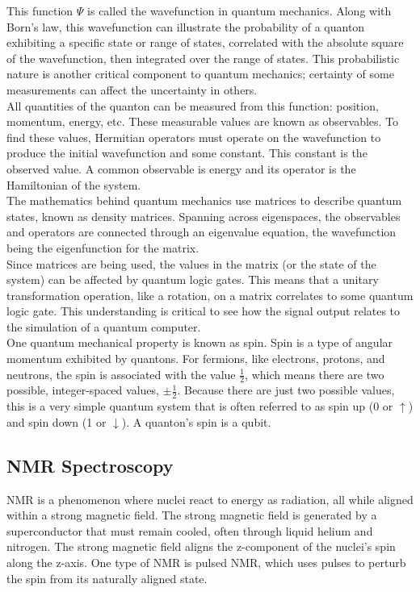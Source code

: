 \documentclass[11pt]{article}
\begin{document}
\begin{multicols}{2}
This function $\Psi$ is called the wavefunction in quantum mechanics. Along with Born's law, this wavefunction can illustrate the probability of a quanton exhibiting a specific state or range of states, correlated with the absolute square of the wavefunction, then integrated over the range of states. This probabilistic nature is another critical component to quantum mechanics; certainty of some measurements can affect the uncertainty in others. \\

All quantities of the quanton can be measured from this function: position, momentum, energy, etc. These measurable values are known as observables. To find these values, Hermitian operators must operate on the wavefunction to produce the initial wavefunction and some constant. This constant is the observed value. A common observable is energy and its operator is the Hamiltonian of the system. \\

The mathematics behind quantum mechanics use matrices to describe quantum states, known as density matrices. Spanning across eigenspaces, the observables and operators are connected through an eigenvalue equation, the wavefunction being the eigenfunction for the matrix. \\

Since matrices are being used, the values in the matrix (or the state of the system) can be affected by quantum logic gates. This means that a unitary transformation operation, like a rotation, on a matrix correlates to some quantum logic gate. This understanding is critical to see how the signal output relates to the simulation of a quantum computer. \\

One quantum mechanical property is known as spin. Spin is a type of angular momentum exhibited by quantons. For fermions, like electrons, protons, and neutrons, the spin is associated with the value $\frac{1}{2}$, which means there are two possible, integer-spaced values, $\pm\frac{1}{2}$. Because there are just two possible values, this is a very simple quantum system that is often referred to as spin up (0 or $\uparrow$) and spin down (1 or $\downarrow$). A quanton's spin is a qubit.

  \subsection{NMR Spectroscopy}
  NMR is a phenomenon where nuclei react to energy as radiation, all while aligned within a strong magnetic field. The strong magnetic field is generated by a superconductor that must remain cooled, often through liquid helium and nitrogen. The strong magnetic field aligns the z-component of the nuclei's spin along the z-axis. One type of NMR is pulsed NMR, which uses pulses to perturb the spin from its naturally aligned state.\cite{nmr-roberts} \\


\end{multicols}
\end{document}
